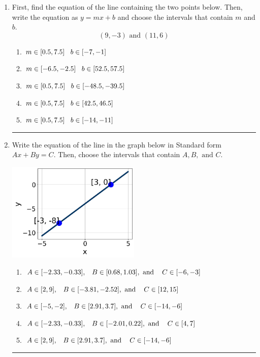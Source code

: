\documentclass[14pt]{extbook}
\newcommand{\litem}[1]{\item#1\hspace*{-1cm}\rule{\textwidth}{0.4pt}}
\begin{document}
\begin{enumerate}
{\begin{enumerate}[label=\Alph*.]
\end{enumerate} }
\litem{
First, find the equation of the line containing the two points below. Then, write the equation as $ y=mx+b $ and choose the intervals that contain $m$ and $b$.\[ (9, -3) \text{ and } (11, 6) \]\begin{enumerate}[label=\Alph*.]
\item \( m \in [0.5, 7.5] \hspace*{3mm} b \in [-7, -1] \)
\item \( m \in [-6.5, -2.5] \hspace*{3mm} b \in [52.5, 57.5] \)
\item \( m \in [0.5, 7.5] \hspace*{3mm} b \in [-48.5, -39.5] \)
\item \( m \in [0.5, 7.5] \hspace*{3mm} b \in [42.5, 46.5] \)
\item \( m \in [0.5, 7.5] \hspace*{3mm} b \in [-14, -11] \)

\end{enumerate} }
\litem{
Write the equation of the line in the graph below in Standard form $Ax+By=C$. Then, choose the intervals that contain $A, B, \text{ and } C$.
\begin{center}
    \includegraphics[width=0.5\textwidth]{../Figures/linearGraphToStandardB.png}
\end{center}
\begin{enumerate}[label=\Alph*.]
\item \( A \in [-2.33, -0.33], \hspace{3mm} B \in [0.68, 1.03], \text{ and } \hspace{3mm} C \in [-6, -3] \)
\item \( A \in [2, 9], \hspace{3mm} B \in [-3.81, -2.52], \text{ and } \hspace{3mm} C \in [12, 15] \)
\item \( A \in [-5, -2], \hspace{3mm} B \in [2.91, 3.7], \text{ and } \hspace{3mm} C \in [-14, -6] \)
\item \( A \in [-2.33, -0.33], \hspace{3mm} B \in [-2.01, 0.22], \text{ and } \hspace{3mm} C \in [4, 7] \)
\item \( A \in [2, 9], \hspace{3mm} B \in [2.91, 3.7], \text{ and } \hspace{3mm} C \in [-14, -6] \)

\end{enumerate} }
\end{enumerate}
\end{document}
